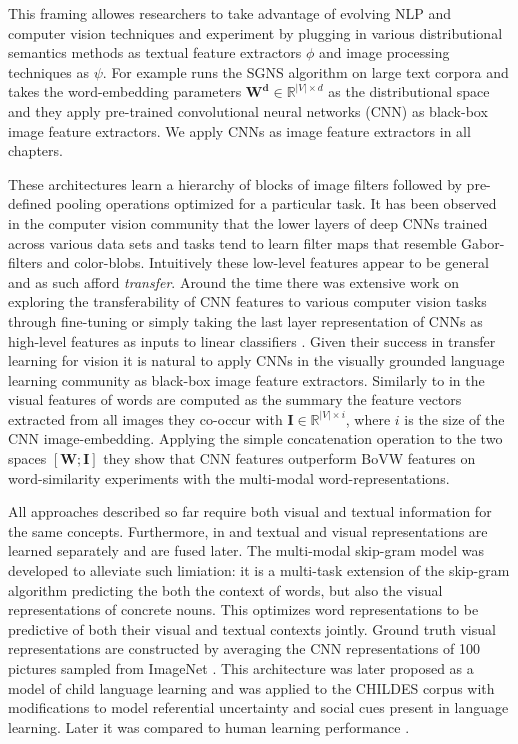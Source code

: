 This framing allowes researchers to take advantage of evolving NLP and computer vision techniques
and experiment by plugging in various distributional semantics methods as textual feature extractors
$\phi$ and image processing techniques as $\psi$.
For example \cite{kiela2014learning} runs the SGNS algorithm
on large text corpora and takes the word-embedding parameters
$\mathbf{W^d} \in \mathbb{R}^{|V| \times d}$ as the distributional space and
they apply pre-trained convolutional neural networks (CNN) as black-box image
feature extractors. We apply CNNs as image feature extractors in all chapters.

These architectures learn a hierarchy of blocks of image filters followed by
pre-defined pooling operations optimized for a particular task.
It has been observed in the computer vision community that the lower layers of
deep CNNs trained across various data sets and tasks tend to learn filter maps
that resemble Gabor-filters and color-blobs. Intuitively these low-level features appear to be general
and as such afford \emph{transfer}. Around the time there was extensive work on exploring the transferability
of CNN features to various computer vision tasks through fine-tuning
 \citep{donahue2014decaf,oquab2014learning} or simply taking the last layer representation of CNNs
as high-level features as inputs to linear classifiers \citep{girshick2014rich,sharif2014cnn}.
Given their success in transfer learning for vision it is natural to apply CNNs in the 
visually grounded language learning community as black-box image feature extractors. 
Similarly to \cite{bruni2014multimodal} in
\cite{kiela2014learning} the visual features of words are computed as the summary the feature vectors
extracted from all images they co-occur with $\mathbf{I} \in \mathbb{R}^{|V| \times i}$, where $i$ is
the size of the CNN image-embedding.
Applying the simple concatenation operation to the two spaces $[\mathbf{W};\mathbf{I}]$
they show that CNN features outperform BoVW features on word-similarity
experiments with the multi-modal word-representations.

All approaches described so far require both visual and textual information for the same concepts.
Furthermore, in \citep{bruni2014multimodal} and \citep{kiela2014learning} textual and visual
representations are learned separately and are fused later.
The multi-modal skip-gram \cite{lazaridou2015combining} model was developed to alleviate such limiation:
it is a multi-task extension of the skip-gram algorithm predicting the both the context of words, but also
the visual representations of concrete nouns. This optimizes word representations to be predictive of
both their visual and textual contexts jointly. Ground truth visual representations are constructed by averaging
the CNN representations \cite{krizhevsky2012imagenet} of 100 pictures sampled from ImageNet \cite{deng2009imagenet}.
This architecture was later proposed as a model of child language learning and
was applied to the CHILDES corpus \cite{macwhinney2014childes} with modifications to model referential
uncertainty and social cues \cite{lazaridou2016multimodal} present in language learning. 
Later it was compared to human learning performance \cite{lazaridou2017multimodal}.


